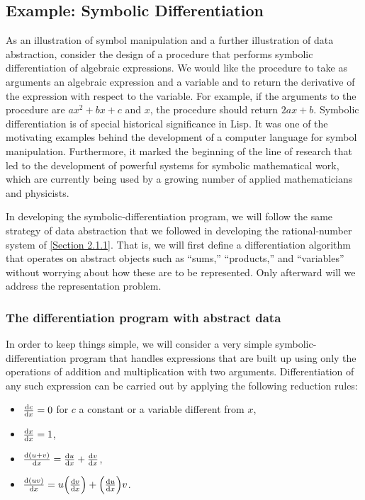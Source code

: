 \subsection{Example: Symbolic Differentiation}
\label{Section 2.3.2}

As an illustration of symbol manipulation and a further illustration of data abstraction, consider the design of a procedure that performs symbolic differentiation of algebraic expressions.
We would like the procedure to take as arguments an algebraic expression and a variable and to return the derivative of the expression with respect to the variable.
For example, if the arguments to the procedure are \( a x^2 + b x + c \) and \( x \), the procedure should return \( 2a x + b \).
Symbolic differentiation is of special historical significance in Lisp.
It was one of the motivating examples behind the development of a computer language for symbol manipulation.
Furthermore, it marked the beginning of the line of research that led to the development of powerful systems for symbolic mathematical work, which are currently being used by a growing number of applied mathematicians and physicists.

In developing the symbolic-differentiation program, we will follow the same strategy of data abstraction that we followed in developing the rational-number system of \cref{Section 2.1.1}.
That is, we will first define a differentiation algorithm that operates on abstract objects such as “sums,” “products,” and “variables” without worrying about how these are to be represented.
Only afterward will we address the representation problem.



\subsubsection*{The differentiation program with abstract data}

In order to keep things simple, we will consider a very simple symbolic-differentiation program that handles expressions that are built up using only the operations of addition and multiplication with two arguments.
Differentiation of any such expression can be carried out by applying the following reduction rules:
\begin{itemize}

	\item
		\( \frac{\mathrm{d} c}{\mathrm{d} x} = 0 \) for \( c \) a constant or a variable different from \( x \),

	\item
		\( \frac{\mathrm{d} x}{\mathrm{d} x} = 1 \),

	\item
		\( \frac{\mathrm{d} (u + v)}{\mathrm{d} x} = \frac{\mathrm{d} u}{\mathrm{d} x} + \frac{\mathrm{d} v}{\mathrm{d} x} \),

	\item
		\( \frac{\mathrm{d} (uv)}{\mathrm{d} x} = u \Bigl( \frac{\mathrm{d} v}{\mathrm{d} x} \Bigr) + \Bigl( \frac{\mathrm{d} u}{\mathrm{d} x} \Bigr) v \).
\end{itemize}

